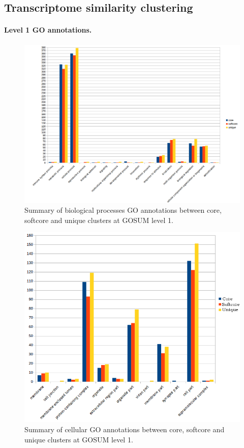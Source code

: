 \documentclass[12pt]{article}
\begin{document}
\FloatBarrier

\subsection{Transcriptome similarity clustering}


\paragraph{Level 1 GO annotations.}
\FloatBarrier


\begin{figure} 
\includegraphics[scale=.58]{3Aug18_cluster-investigation/figures/gosum-pan/Pan-gosum1-bio-graph.png} 
\caption{Summary of biological processes GO annotations between core, softcore and unique clusters at GOSUM level 1.} 
\label{fig:PanGo1Bio}
\end{figure} 
\FloatBarrier

\begin{figure} 
\includegraphics[scale=.8]{3Aug18_cluster-investigation/figures/gosum-pan/Pan-gosum1-cell-split.png} 
\caption{Summary of cellular GO annotations between core, softcore and unique clusters at GOSUM level 1.} 
\label{fig:PanGo1Cell}
\end{figure} 
\FloatBarrier
\end{document}
